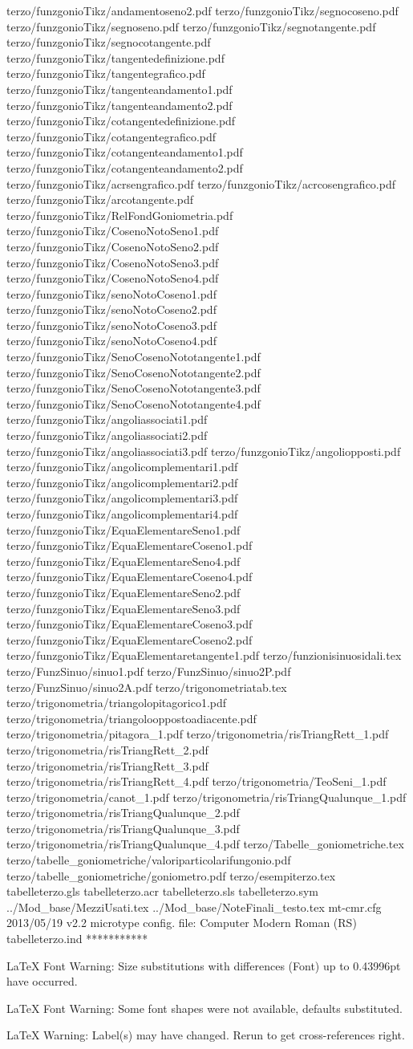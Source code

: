 terzo/funzgonioTikz/andamentoseno2.pdf
terzo/funzgonioTikz/segnocoseno.pdf
terzo/funzgonioTikz/segnoseno.pdf
terzo/funzgonioTikz/segnotangente.pdf
terzo/funzgonioTikz/segnocotangente.pdf
terzo/funzgonioTikz/tangentedefinizione.pdf
terzo/funzgonioTikz/tangentegrafico.pdf
terzo/funzgonioTikz/tangenteandamento1.pdf
terzo/funzgonioTikz/tangenteandamento2.pdf
terzo/funzgonioTikz/cotangentedefinizione.pdf
terzo/funzgonioTikz/cotangentegrafico.pdf
terzo/funzgonioTikz/cotangenteandamento1.pdf
terzo/funzgonioTikz/cotangenteandamento2.pdf
terzo/funzgonioTikz/acrsengrafico.pdf
terzo/funzgonioTikz/acrcosengrafico.pdf
terzo/funzgonioTikz/arcotangente.pdf
terzo/funzgonioTikz/RelFondGoniometria.pdf
terzo/funzgonioTikz/CosenoNotoSeno1.pdf
terzo/funzgonioTikz/CosenoNotoSeno2.pdf
terzo/funzgonioTikz/CosenoNotoSeno3.pdf
terzo/funzgonioTikz/CosenoNotoSeno4.pdf
terzo/funzgonioTikz/senoNotoCoseno1.pdf
terzo/funzgonioTikz/senoNotoCoseno2.pdf
terzo/funzgonioTikz/senoNotoCoseno3.pdf
terzo/funzgonioTikz/senoNotoCoseno4.pdf
terzo/funzgonioTikz/SenoCosenoNototangente1.pdf
terzo/funzgonioTikz/SenoCosenoNototangente2.pdf
terzo/funzgonioTikz/SenoCosenoNototangente3.pdf
terzo/funzgonioTikz/SenoCosenoNototangente4.pdf
terzo/funzgonioTikz/angoliassociati1.pdf
terzo/funzgonioTikz/angoliassociati2.pdf
terzo/funzgonioTikz/angoliassociati3.pdf
terzo/funzgonioTikz/angoliopposti.pdf
terzo/funzgonioTikz/angolicomplementari1.pdf
terzo/funzgonioTikz/angolicomplementari2.pdf
terzo/funzgonioTikz/angolicomplementari3.pdf
terzo/funzgonioTikz/angolicomplementari4.pdf
terzo/funzgonioTikz/EquaElementareSeno1.pdf
terzo/funzgonioTikz/EquaElementareCoseno1.pdf
terzo/funzgonioTikz/EquaElementareSeno4.pdf
terzo/funzgonioTikz/EquaElementareCoseno4.pdf
terzo/funzgonioTikz/EquaElementareSeno2.pdf
terzo/funzgonioTikz/EquaElementareSeno3.pdf
terzo/funzgonioTikz/EquaElementareCoseno3.pdf
terzo/funzgonioTikz/EquaElementareCoseno2.pdf
terzo/funzgonioTikz/EquaElementaretangente1.pdf
terzo/funzionisinuosidali.tex
terzo/FunzSinuo/sinuo1.pdf
terzo/FunzSinuo/sinuo2P.pdf
terzo/FunzSinuo/sinuo2A.pdf
terzo/trigonometriatab.tex
terzo/trigonometria/triangolopitagorico1.pdf
terzo/trigonometria/triangolooppostoadiacente.pdf
terzo/trigonometria/pitagora_1.pdf
terzo/trigonometria/risTriangRett_1.pdf
terzo/trigonometria/risTriangRett_2.pdf
terzo/trigonometria/risTriangRett_3.pdf
terzo/trigonometria/risTriangRett_4.pdf
terzo/trigonometria/TeoSeni_1.pdf
terzo/trigonometria/canot_1.pdf
terzo/trigonometria/risTriangQualunque_1.pdf
terzo/trigonometria/risTriangQualunque_2.pdf
terzo/trigonometria/risTriangQualunque_3.pdf
terzo/trigonometria/risTriangQualunque_4.pdf
terzo/Tabelle_goniometriche.tex
terzo/tabelle_goniometriche/valoriparticolarifungonio.pdf
terzo/tabelle_goniometriche/goniometro.pdf
terzo/esempiterzo.tex
tabelleterzo.gls
tabelleterzo.acr
tabelleterzo.sls
tabelleterzo.sym
../Mod_base/MezziUsati.tex
../Mod_base/NoteFinali_testo.tex
  mt-cmr.cfg    2013/05/19 v2.2 microtype config. file: Computer Modern Roman (RS)
tabelleterzo.ind
 ***********


LaTeX Font Warning: Size substitutions with differences
(Font)              up to 0.43996pt have occurred.


LaTeX Font Warning: Some font shapes were not available, defaults substituted.


LaTeX Warning: Label(s) may have changed. Rerun to get cross-references right.

